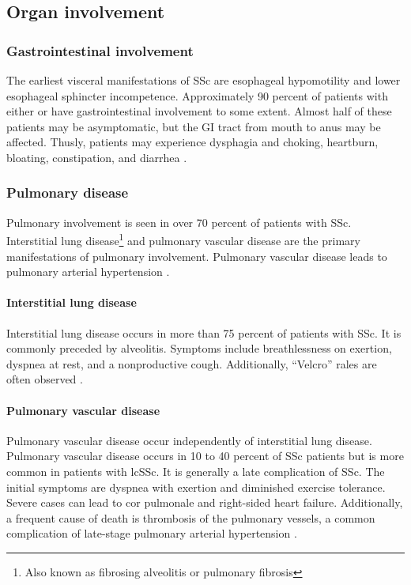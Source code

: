 \subsection{Organ involvement}

\subsubsection{Gastrointestinal involvement}

The earliest visceral manifestations of SSc are esophageal hypomotility and
lower esophageal sphincter incompetence. Approximately 90 percent of patients
with either \dcSSc or \lcSSc have gastrointestinal involvement to some extent.
Almost half of these patients may be asymptomatic, but the GI tract from mouth
to anus may be affected. Thusly, patients may experience dysphagia and
choking, heartburn, bloating, constipation, and diarrhea \citep{overviewSSc}.

\subsubsection{Pulmonary disease}

Pulmonary involvement is seen in over 70 percent of patients with SSc.
Interstitial lung disease\footnote{Also known as fibrosing alveolitis or
pulmonary fibrosis} and pulmonary vascular disease are the primary
manifestations of pulmonary involvement. Pulmonary vascular disease leads to
pulmonary arterial hypertension \citep{overviewSSc}.

\paragraph{Interstitial lung disease}

Interstitial lung disease occurs in more than 75 percent of patients with SSc.
It is commonly preceded by alveolitis. Symptoms include breathlessness on
exertion, dyspnea at rest, and a nonproductive cough. Additionally, ``Velcro''
rales are often observed \citep{overviewSSc}.

\paragraph{Pulmonary vascular disease}

Pulmonary vascular disease occur independently of interstitial lung disease.
Pulmonary vascular disease occurs in 10 to 40 percent of SSc patients but is
more common in patients with lcSSc. It is generally a late complication of
SSc. The initial symptoms are dyspnea with exertion and diminished exercise
tolerance. Severe cases can lead to cor pulmonale and right-sided heart
failure. Additionally, a frequent cause of death is thrombosis of the
pulmonary vessels, a common complication of late-stage pulmonary arterial
hypertension \citep{overviewSSc}.

